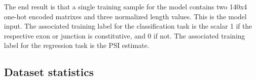 The end result is that a single training sample for the model contains two 140x4 one-hot encoded matrixes and three normalized length values. This is the model input.
The associated training label for the classification task is the scalar 1 if the respective exon or junction is constitutive, and 0 if not. The associated training label for the regression task is the PSI estimate. 
\subsection{Dataset statistics} \label{subsec:datasetstatistics}

%		

